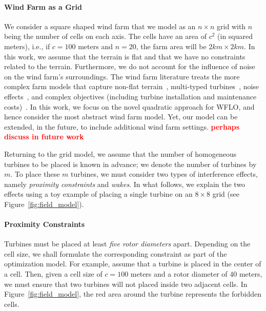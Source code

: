 \documentclass[preprint,12pt]{elsarticle}
\newcommand{\todo}[1]{{\textcolor{red}{\bf {#1}}}}
\begin{document}
\paragraph{Wind Farm as a Grid} We consider a square shaped wind farm that we model 
as an $n\times n$ grid
with $n$ being the number of cells on each axis. 
The cells have an area of $c^2$ (in squared meters), i.e.,
if $c=100$ meters and $n=20$, the farm area will be $2km\times 2km$.
In this work, we assume that the terrain is flat and that 
we have no constraints related to the terrain.
Furthermore, we do not account for the influence of noise
on the wind farm's surroundings. The wind farm literature treats the more complex
farm models that capture non-flat terrain~\cite{song2015lazy,kuo2016wind}, multi-typed turbines~\cite{feng2017design}, noise effects~\cite{Zhang2014,sorkhabi2016impact,yin2014multi}, and complex objectives (including turbine installation  and maintenance costs)~\cite{lackner2007analytical}.
In this work, we focus on the novel quadratic approach for WFLO, and hence
consider the most abstract wind farm model. Yet, our model can be extended,
in the future, to include 
additional wind farm settings. \todo{perhaps discuss in future work} 
 
Returning to the grid model, we assume that the number of homogeneous turbines to be placed is known 
in advance; we denote the number of turbines by $m$. To place these $m$ turbines, 
we must consider two types of interference effects, namely \emph{proximity constraints} and \emph{wakes}.
In what follows, we explain the two effects using a toy example of placing a single turbine on an 
$8\times8$ grid (see Figure~\ref{fig:field_model}).

\paragraph{Proximity Constraints} Turbines must be placed at least \emph{five rotor diameters} apart. Depending on the cell size, 
	we shall formulate the corresponding constraint as part of the optimization model. For example, assume that a turbine is placed
	in the center of a cell. Then, given a cell size of $c = 100$ meters and a rotor diameter of $40$ meters, 
	we must ensure that two turbines will not placed inside two adjacent cells. In Figure~\ref{fig:field_model}, 
	the red area around the turbine represents the forbidden cells.
	 
\end{document}
